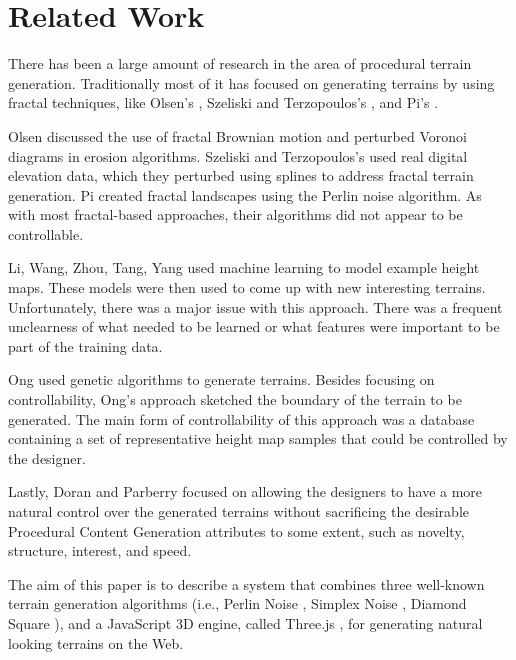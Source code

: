 \section{Related Work} 
\label{sec:related_work}

There has been a large amount of research in the area of procedural terrain generation. Traditionally most of it has focused on generating terrains by using fractal techniques, like Olsen's \cite{lechner:2006}, Szeliski and Terzopoulos's \cite{szeliski:1989}, and Pi's \cite{pi:2006}.

Olsen \cite{lechner:2006} discussed the use of fractal Brownian motion and perturbed Voronoi diagrams in erosion algorithms. Szeliski and Terzopoulos's \cite{szeliski:1989} used real digital elevation data, which they perturbed using splines to address fractal terrain generation. Pi \cite{pi:2006} created fractal landscapes using the Perlin noise algorithm. As with most fractal-based approaches, their algorithms did not appear to be controllable.

Li, Wang, Zhou, Tang, Yang \cite{li:2006} used machine learning to model example height maps. These models were then used to come up with new interesting terrains. Unfortunately, there was a major issue with this approach. There was a frequent unclearness of what needed to be learned or what features were important to be part of the training data.

Ong \cite{ong:2005} used genetic algorithms to generate terrains. Besides focusing on controllability, Ong's approach sketched the boundary of the terrain to be generated. The main form of controllability of this approach was a database containing a set of representative height map samples that could be controlled by the designer.
  
Lastly, Doran and Parberry \cite{doran:2010} focused on allowing the designers to have a more natural control over the generated terrains without sacrificing the desirable Procedural Content Generation attributes to some extent, such as novelty, structure, interest, and speed.

The aim of this paper is to describe a system that combines three well-known terrain generation algorithms (i.e., Perlin Noise  \cite{perlin:2002}, Simplex Noise \cite{perlin:2001}, Diamond Square \cite{fournier:1982}), and a JavaScript 3D engine, called Three.js \cite{threeJS}, for generating natural looking terrains on the Web.

